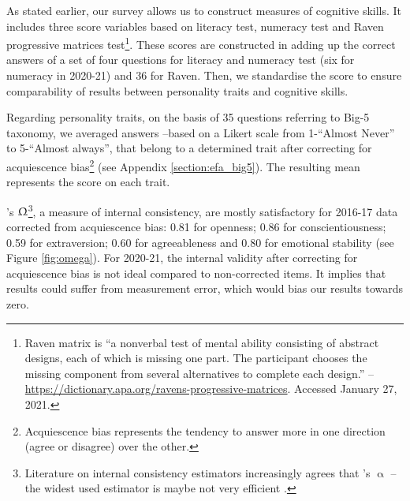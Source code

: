 \documentclass[a4paper, 12pt, onecolumn]{article}
\begin{document}
As stated earlier, our survey allows us to construct measures of cognitive skills.
It includes three score variables based on literacy test, numeracy test and Raven progressive matrices test\footnote{Raven matrix is ``a nonverbal test of mental ability consisting of abstract designs, each of which is missing one part. The participant chooses the missing component from several alternatives to complete each design.'' -- \url{https://dictionary.apa.org/ravens-progressive-matrices}. Accessed January 27, 2021.}.
These scores are constructed in adding up the correct answers of a set of four questions for literacy and numeracy test (six for numeracy in 2020-21) and 36 for Raven.
Then, we standardise the score to ensure comparability of results between personality traits and cognitive skills.

Regarding personality traits, on the basis of 35 questions referring to Big-5 taxonomy, we averaged answers --based on a Likert scale from 1-``Almost Never'' to 5-``Almost always'', that belong to a determined trait after correcting for acquiescence bias\footnote{Acquiescence bias represents the tendency to answer more in one direction (agree or disagree) over the other.} (see Appendix \ref{section:efa_big5}).
The resulting mean represents the score on each trait.

\citeauthor{McDonald1999}'s $\Upomega$\footnote{Literature on internal consistency estimators increasingly agrees that \citeauthor{Cronbach1951}'s $\upalpha$ --the widest used estimator is maybe not very efficient \citep{Bourque2019, TrizanoHermosilla2016}.}, a measure of internal consistency, are mostly satisfactory for 2016-17 data corrected from acquiescence bias: 0.81 for openness; 0.86 for conscientiousness; 0.59 for extraversion; 0.60 for agreeableness and 0.80 for emotional stability (see Figure \ref{fig:omega}).
For 2020-21, the internal validity after correcting for acquiescence bias is not ideal compared to non-corrected items.
It implies that results could suffer from measurement error, which would bias our results towards zero.

\end{document}
